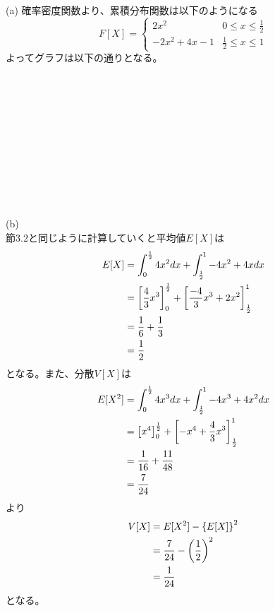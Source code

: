 \documentclass{jsarticle}
\begin{document}
    \subsection{}
    (a)
    確率密度関数より、累積分布関数は以下のようになる
    \begin{equation}
      F[X] = \left\{
      \begin{array}{ll}
        2x^2 & 0\le x\le \frac{1}{2} \\
        -2x^2 + 4x -1 & \frac{1}{2}\le x\le1
      \end{array}
      \right.
    \end{equation}
    よってグラフは以下の通りとなる。\\
    \\
    \\
    \\
    \\
    \\
    \\
    \\
    \\
    \\
    \\
    \\
    (b)\\
    節3.2と同じように計算していくと平均値$E[X]$は
    \begin{align}
      E[X] &= \int_0^{\frac{1}{2}}4x^2 dx + \int_{\frac{1}{2}}^1 -4x^2 + 4xdx \notag \\
      &= \left[\frac{4}{3}x^3\right]_0^{\frac{1}{2}} + \left[\frac{-4}{3}x^3 + 2x^2\right]_{\frac{1}{2}}^1 \notag \\
      &= \frac{1}{6} + \frac{1}{3} \notag \\
      &= \frac{1}{2}
    \end{align}
    となる。また、分散$V[X]$は
    \begin{align}
      E[X^2] &= \int_0^{\frac{1}{2}}4x^3 dx + \int_{\frac{1}{2}}^1 -4x^3 + 4x^2dx \notag \\
      &= \left[x^4\right]_0^{\frac{1}{2}} + \left[-x^4 + \frac{4}{3}x^3\right]_{\frac{1}{2}}^1 \notag \\
      &= \frac{1}{16} + \frac{11}{48} \notag \\
      &= \frac{7}{24}
    \end{align}
    より
    \begin{align}
      V[X] &= E[X^2] - \left\{E[X]\right\}^2 \notag \\
      &= \frac{7}{24} - \left(\frac{1}{2}\right)^2 \notag \\
      &= \frac{1}{24}
    \end{align}
    となる。
\end{document}

